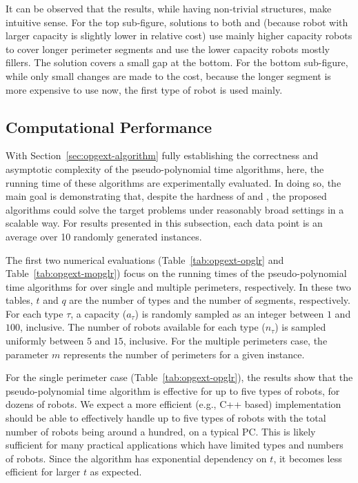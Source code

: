 It can be observed that the results, while having non-trivial structures, 
make intuitive sense. For the top sub-figure, solutions to both \opglr 
and \opgmc (because robot with larger capacity is slightly lower in 
relative cost) use mainly higher capacity robots to cover longer perimeter 
segments and use the lower capacity robots mostly fillers. The solution 
covers a small gap at the bottom. For the bottom sub-figure, while only 
small changes are made to the cost, because the longer segment is more 
expensive to use now, the first type of robot is used mainly. 

\subsection{Computational Performance}
With Section~\ref{sec:opgext-algorithm} fully establishing the correctness and 
asymptotic complexity of the pseudo-polynomial time algorithms, here, the 
running time of these algorithms are experimentally evaluated. In doing 
so, the main goal is demonstrating that, despite the hardness of \opglr 
and \opgmc, the proposed algorithms could solve the target problems under 
reasonably broad settings in a scalable way. For results presented in 
this subsection, each data point is an average over 10 randomly generated 
instances. 

The first two numerical evaluations (Table~\ref{tab:opgext-opglr} and 
Table~\ref{tab:opgext-mopglr}) focus on the running times of the pseudo-polynomial 
time algorithms for \opglr over single and multiple perimeters, 
respectively. In these two tables, $t$ and $q$ are the number of types 
and the number of segments, respectively. For each type $\tau$, a 
capacity ($a_{\tau}$) is randomly sampled as an integer between $1$ and 
$100$, inclusive. The number of robots available for each type ($n_{\tau}$) 
is sampled uniformly between $5$ and $15$, inclusive. For the multiple 
perimeters case, the parameter $m$ represents the number of perimeters for 
a given instance.

For the single perimeter case (Table~\ref{tab:opgext-opglr}), the results show 
that the pseudo-polynomial time algorithm is effective for up to five 
types of robots, for dozens of robots. We expect a more efficient 
(e.g., C++ based) implementation should be able to effectively handle 
up to five types of robots with the total number of robots being around 
a hundred, on a typical PC. This is likely sufficient for many practical 
applications which have limited types and numbers of robots. Since the 
algorithm has exponential dependency on $t$, it becomes less efficient 
for larger $t$ as expected.  

